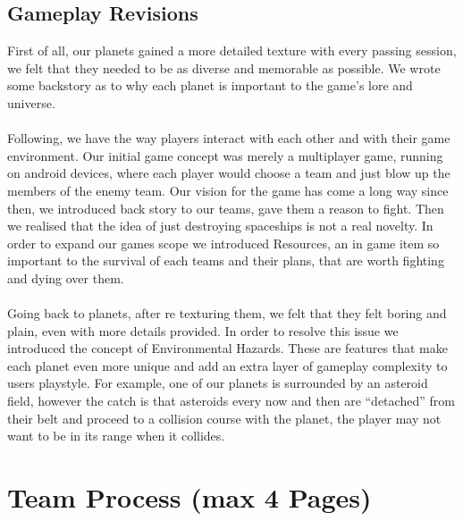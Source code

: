 \documentclass[11pt,a4paper]{article}
\begin{document}
        \subsection{Gameplay Revisions}
        First of all, our planets gained a more detailed texture with every passing session, we felt that they needed to be as diverse and memorable as possible. We wrote some backstory as to why each planet is important to the game's lore and universe. \\ \\ 
        Following, we have the way players interact with each other and with their game environment. Our initial game concept was merely a multiplayer game, running on android devices, where each player would choose a team and just blow up the members of the enemy team. Our vision for the game has come a long way since then, we introduced back story to our teams, gave them a reason to fight. Then we realised that the idea of just destroying spaceships is not a real novelty. In order to expand our games scope we introduced Resources, an in game item so important to the survival of each teams and their plans, that are worth fighting and dying over them. \\ \\
        Going back to planets, after re texturing them, we felt that they felt boring and plain, even with more details provided. In order to resolve this issue we introduced the concept of Environmental Hazards. These are features that make each planet even more unique and add an extra layer of gameplay complexity to users playstyle. For example, one of our planets is surrounded by an asteroid field, however the catch is that asteroids every now and then are “detached” from their belt and proceed to a collision course with the planet, the player may not want to be in its range when it collides.

        \section{Team Process (max 4 Pages)}
        
\end{document}
